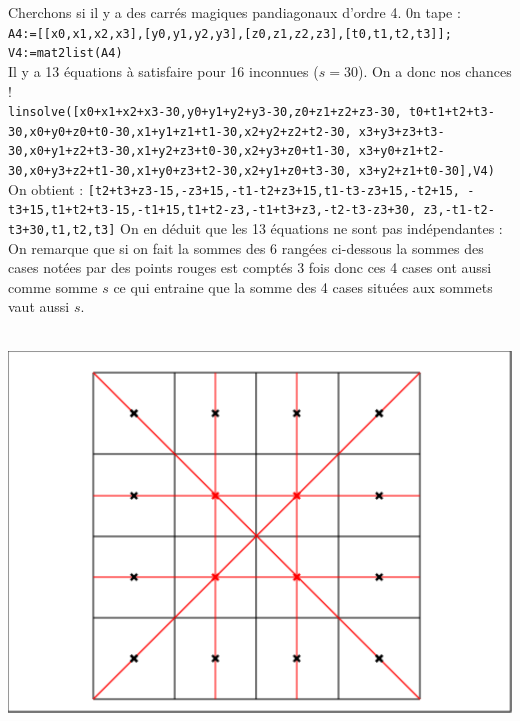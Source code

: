 \documentclass[a4paper,11pt]{book}
\begin{document}
Cherchons si il y a des carr\'es magiques pandiagonaux d'ordre 4.
0n tape :\\
{\tt A4:=[[x0,x1,x2,x3],[y0,y1,y2,y3],[z0,z1,z2,z3],[t0,t1,t2,t3]];}\\
{\tt V4:=mat2list(A4)}\\
Il y a 13 \'equations \`a satisfaire pour 16 inconnues ($s=30$). On a donc nos 
chances !\\
{\tt linsolve([x0+x1+x2+x3-30,y0+y1+y2+y3-30,z0+z1+z2+z3-30, 
t0+t1+t2+t3-30,x0+y0+z0+t0-30,x1+y1+z1+t1-30,x2+y2+z2+t2-30,
x3+y3+z3+t3-30,x0+y1+z2+t3-30,x1+y2+z3+t0-30,x2+y3+z0+t1-30,
x3+y0+z1+t2-30,x0+y3+z2+t1-30,x1+y0+z3+t2-30,x2+y1+z0+t3-30,
x3+y2+z1+t0-30],V4)}\\
On obtient :
{\tt [t2+t3+z3-15,-z3+15,-t1-t2+z3+15,t1-t3-z3+15,-t2+15,
-t3+15,t1+t2+t3-15,-t1+15,t1+t2-z3,-t1+t3+z3,-t2-t3-z3+30,
z3,-t1-t2-t3+30,t1,t2,t3]}
On en d\'eduit que les 13 \'equations ne sont pas ind\'ependantes :
On remarque que si on fait la sommes des 6 rang\'ees ci-dessous la sommes des 
cases not\'ees par des points rouges  est compt\'es 3 fois donc ces 4 cases
ont aussi comme somme $s$ ce qui entraine que la somme des 4 cases situ\'ees 
aux sommets vaut aussi $s$.\\
\ \\
\begin{minipage}[h]{6.5cm}
\includegraphics[width=\textwidth]{carrem4}
\end{minipage}
\end{document}
